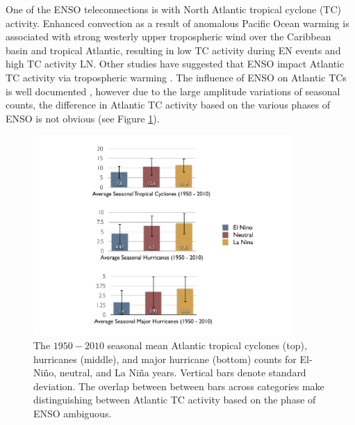 \documentclass[]{article}
\begin{document}
One of the ENSO teleconnections is with North Atlantic tropical cyclone (TC) activity. Enhanced convection as a result of anomalous Pacific Ocean warming is associated with strong westerly upper tropospheric wind over the Caribbean basin and tropical Atlantic, resulting in low TC activity during EN events and high TC activity LN. Other studies have suggested that ENSO impact Atlantic TC activity via tropospheric warming \cite{tang2004}. The influence of ENSO on Atlantic TCs is well documented \cite{gray1984a, bove1998, elsner2001b,klotzbach2011nino}, however due to the large amplitude variations of seasonal counts, the difference in Atlantic TC activity based on the various phases of ENSO is not obvious (see Figure \ref{fig:enso_bars}).
\begin{figure}[htbp]
	\centering
		\includegraphics[height=3in]{figures/nino_nina_avg_diff.pdf}
	\caption{The $1950-2010$ seasonal mean Atlantic tropical cyclones (top), hurricanes (middle), and major hurricane (bottom) counts for El-Ni\~no, neutral, and La Ni\~na years. Vertical bars denote standard deviation. The overlap between between bars across categories make distinguishing between Atlantic TC activity based on the phase of ENSO ambiguous.}
	\label{fig:enso_bars}
\end{figure}
\end{document}
